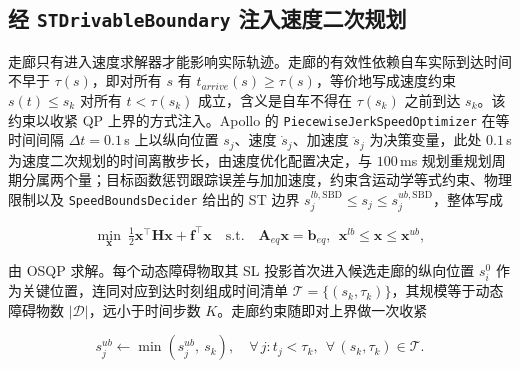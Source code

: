 \documentclass[a4paper,11pt]{ctexart}
\theoremstyle{definition}
\begin{document}
\subsection{经 \texttt{STDrivableBoundary} 注入速度二次规划}
\label{sec:method_inject}

走廊只有进入速度求解器才能影响实际轨迹。走廊的有效性依赖自车实际到达时间不早于 $\tau(s)$，即对所有 $s$ 有 $t_{arrive}(s)\geq\tau(s)$，等价地写成速度约束 $s(t)\leq s_k$ 对所有 $t<\tau(s_k)$ 成立，含义是自车不得在 $\tau(s_k)$ 之前到达 $s_k$。该约束以收紧 QP 上界的方式注入。Apollo 的 \texttt{PiecewiseJerkSpeedOptimizer} 在等时间间隔 $\Delta t = 0.1$\,s 上以纵向位置 $s_j$、速度 $\dot{s}_j$、加速度 $\ddot{s}_j$ 为决策变量，此处 $0.1$\,s 为速度二次规划的时间离散步长，由速度优化配置决定，与 $100$\,ms 规划重规划周期分属两个量；目标函数惩罚跟踪误差与加加速度，约束含运动学等式约束、物理限制以及 \texttt{SpeedBoundsDecider} 给出的 ST 边界 $s_j^{lb,\mathrm{SBD}} \leq s_j \leq s_j^{ub,\mathrm{SBD}}$，整体写成

\begin{equation}
    \min_{\mathbf{x}}\ \tfrac{1}{2}\mathbf{x}^{\top}\mathbf{H}\mathbf{x} + \mathbf{f}^{\top}\mathbf{x}
    \quad \text{s.t.}\quad \mathbf{A}_{eq}\mathbf{x} = \mathbf{b}_{eq},\ \ \mathbf{x}^{lb} \leq \mathbf{x} \leq \mathbf{x}^{ub},
    \label{eq:qp_compact}
\end{equation}

由 OSQP 求解。每个动态障碍物取其 SL 投影首次进入候选走廊的纵向位置 $s_i^{0}$ 作为关键位置，连同对应到达时刻组成时间清单 $\mathcal{T} = \{(s_k, \tau_k)\}$，其规模等于动态障碍物数 $|\mathcal{D}|$，远小于时间步数 $K$。走廊约束随即对上界做一次收紧

\begin{equation}
    s_j^{ub} \leftarrow \min\!\left(s_j^{ub},\ s_k\right), \quad \forall\, j: t_j < \tau_k,\ \ \forall\, (s_k, \tau_k) \in \mathcal{T}.
    \label{eq:tighten_ub}
\end{equation}
\end{document}
